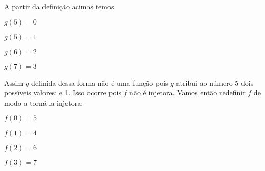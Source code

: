 \documentclass{beamer}
\begin{document}
    \begin{frame}
        A partir da defini\c{c}\~ao acimas temos\pause
        \begin{center}
            $g(5) = 0 $\pause\\

            \vspace{.3cm}

            $g(5) = 1$\pause\\

            \vspace{.3cm}

            $g(6) = 2$\pause\\

            \vspace{.3cm}

            $g(7) = 3$\pause
        \end{center}

        Assim $g$ definida dessa forma \pause n\~ao \'e uma fun\c{c}\~ao \pause pois $g$ atribui ao n\'umero 5 \pause dois poss{\'\i}veis valores:  e 1. \pause Isso ocorre pois $f$ n\~ao \'e injetora. \pause Vamos ent\~ao redefinir $f$ de modo a torn\'a-la injetora:\pause
        \begin{center}
            $f(0) = 5$\pause\\

            \vspace{.3cm}

            $f(1) = 4$\pause\\

            \vspace{.3cm}

            $f(2) = 6$\pause\\

            \vspace{.3cm}

            $f(3) = 7$\pause
        \end{center}
    \end{frame}
\end{document}
